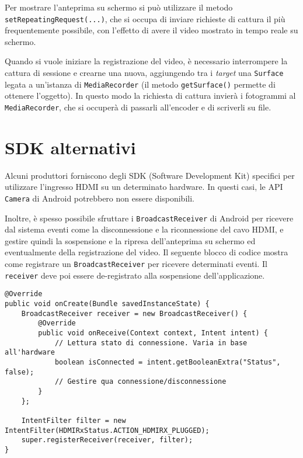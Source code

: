Per mostrare l'anteprima su schermo si può utilizzare il metodo \texttt{setRepeatingRequest(...)}, che si occupa di inviare richieste di cattura il più frequentemente possibile, con l'effetto di avere il video mostrato in tempo reale su schermo.

Quando si vuole iniziare la registrazione del video, è necessario interrompere la cattura di sessione e crearne una nuova, aggiungendo tra i \emph{target} una \texttt{Surface} legata a un'istanza di \texttt{MediaRecorder} (il metodo \texttt{getSurface()} permette di ottenere l'oggetto). In questo modo la richiesta di cattura invierà i fotogrammi al \texttt{MediaRecorder}, che si occuperà di passarli all'encoder e di scriverli su file.

\section{SDK alternativi}
\label{sec:hdmi_sdk}

Alcuni produttori forniscono degli SDK (Software Development Kit) specifici per utilizzare l'ingresso HDMI su un determinato hardware. In questi casi, le API \texttt{Camera} di Android potrebbero non essere disponibili.

Inoltre, è spesso possibile sfruttare i \texttt{BroadcastReceiver} di Android per ricevere dal sistema eventi come la disconnessione e la riconnessione del cavo HDMI, e gestire quindi la sospensione e la ripresa dell'anteprima su schermo ed eventualmente della registrazione del video. Il seguente blocco di codice mostra come registrare un \texttt{BroadcastReceiver} per ricevere determinati eventi. Il \texttt{receiver} deve poi essere de-registrato alla sospensione dell'applicazione.

\begin{verbatim}
@Override
public void onCreate(Bundle savedInstanceState) {
    BroadcastReceiver receiver = new BroadcastReceiver() {
        @Override
        public void onReceive(Context context, Intent intent) {
            // Lettura stato di connessione. Varia in base all'hardware
            boolean isConnected = intent.getBooleanExtra("Status", false);
            // Gestire qua connessione/disconnessione
        }
    };
    
    IntentFilter filter = new IntentFilter(HDMIRxStatus.ACTION_HDMIRX_PLUGGED);
    super.registerReceiver(receiver, filter);
}
\end{verbatim}

